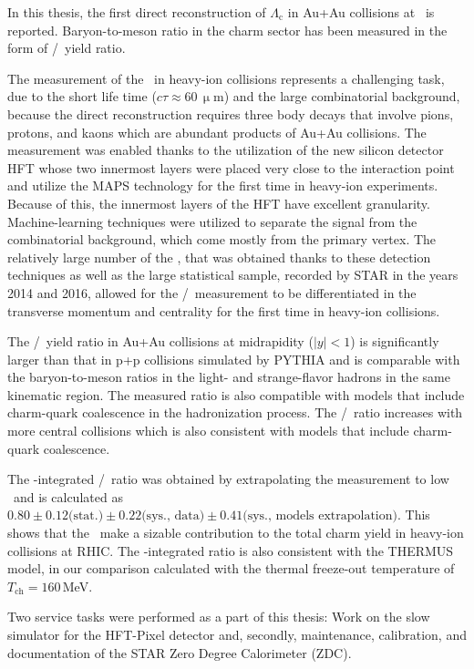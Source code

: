 In this thesis, the first direct reconstruction of $\Lambda_\mathrm{c}$ in Au+Au collisions at \snnFull\ is reported. Baryon-to-meson ratio in the charm sector has been measured in the form of \Lambdac/\dzero\ yield ratio. 

The measurement of the \Lambdac\ in heavy-ion collisions represents a challenging task, due to the short life time ($c\tau \approx 60\,\upmu$m) and the large combinatorial background, because the direct reconstruction requires three body decays that involve pions, protons, and kaons which are abundant products of Au+Au collisions. The measurement was enabled thanks to the utilization of the new silicon detector HFT whose two innermost layers were placed very close to the interaction point and utilize the MAPS technology for the first time in heavy-ion experiments\@. Because of this, the innermost layers of the HFT have excellent granularity. Machine-learning techniques were utilized to separate the signal from the combinatorial background, which come mostly from the primary vertex. The relatively large number of the \Lambdac, that was obtained thanks to these detection techniques as well as the large statistical sample, recorded by STAR in the years 2014 and 2016, allowed for the \Lambdac/\dzero\ measurement to be differentiated in the transverse momentum and centrality for the first time in heavy-ion collisions.

The \Lambdac/\dzero\ yield ratio in Au+Au collisions at midrapidity ($|y| < 1$) is significantly larger than that in p+p collisions simulated by PYTHIA and is comparable with the baryon-to-meson ratios in the light- and strange-flavor hadrons in the same kinematic region. The measured ratio is also compatible with models that include charm-quark coalescence in the hadronization process.
The \Lambdac/\dzero\ ratio increases with more central collisions which is also consistent with models that include charm-quark coalescence.

The \pt-integrated \Lambdac/\dzero\ ratio was obtained by extrapolating the measurement to low \pt\ and is calculated as $0.80\pm0.12\text{(stat.)}\pm0.22\text{(sys., data)}\pm0.41\text{(sys., models extrapolation)}$\@. This shows that the \Lambdac\ make a sizable contribution to the total charm yield in heavy-ion collisions at RHIC. The \pt-integrated ratio is also consistent with the THERMUS model, in our comparison calculated with the thermal freeze-out temperature of $T_\mathrm{ch} = 160\,$MeV\@.


Two service tasks were performed as a part of this thesis: Work on the slow simulator for the HFT-Pixel detector and, secondly, maintenance, calibration, and documentation of the STAR Zero Degree Calorimeter (ZDC). 

